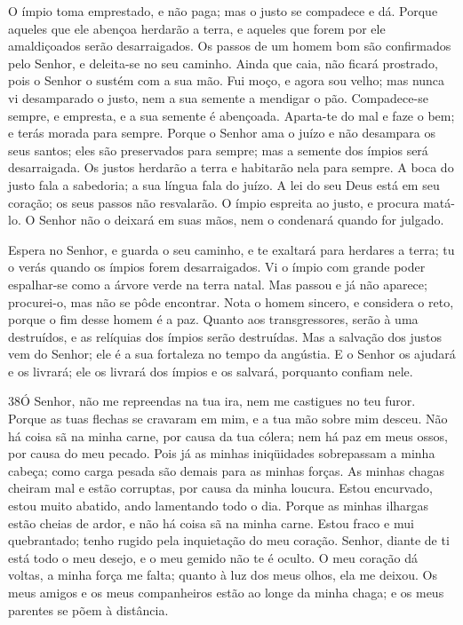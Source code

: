 O ímpio toma emprestado, e não paga; mas o justo se compadece e
dá. Porque aqueles que ele abençoa herdarão a terra, e
aqueles que forem por ele amaldiçoados serão desarraigados.
Os passos de um homem bom são confirmados pelo Senhor, e
deleita-se no seu caminho. Ainda que caia, não ficará
prostrado, pois o Senhor o sustém com a sua mão. Fui moço, e
agora sou velho; mas nunca vi desamparado o justo, nem a sua semente
a mendigar o pão. Compadece-se sempre, e empresta, e a sua
semente é abençoada. Aparta-te do mal e faze o bem; e terás
morada para sempre. Porque o Senhor ama o juízo e não
desampara os seus santos; eles são preservados para sempre; mas a
semente dos ímpios será desarraigada. Os justos herdarão a
terra e habitarão nela para sempre. A boca do justo fala a
sabedoria; a sua língua fala do juízo. A lei do seu Deus está
em seu coração; os seus passos não resvalarão. O ímpio
espreita ao justo, e procura matá-lo. O Senhor não o deixará
em suas mãos, nem o condenará quando for julgado.

Espera no Senhor, e guarda o seu caminho, e te exaltará para
herdares a terra; tu o verás quando os ímpios forem desarraigados.
Vi o ímpio com grande poder espalhar-se como a árvore verde
na terra natal. Mas passou e já não aparece; procurei-o, mas
não se pôde encontrar. Nota o homem sincero, e considera o
reto, porque o fim desse homem é a paz. Quanto aos
transgressores, serão à uma destruídos, e as relíquias dos ímpios
serão destruídas. Mas a salvação dos justos vem do Senhor;
ele é a sua fortaleza no tempo da angústia. E o Senhor os
ajudará e os livrará; ele os livrará dos ímpios e os salvará,
porquanto confiam nele.

\bigskip

\lettrine{38}{}Ó Senhor, não me repreendas na tua ira, nem me
castigues no teu furor. Porque as tuas flechas se cravaram em
mim, e a tua mão sobre mim desceu. Não há coisa sã na minha
carne, por causa da tua cólera; nem há paz em meus ossos, por causa
do meu pecado. Pois já as minhas iniqüidades sobrepassam a minha
cabeça; como carga pesada são demais para as minhas forças. As
minhas chagas cheiram mal e estão corruptas, por causa da minha
loucura.
 Estou encurvado, estou muito abatido, ando lamentando todo o dia. Porque as minhas ilhargas estão cheias de ardor, e não há coisa sã
na minha carne. Estou fraco e mui quebrantado; tenho rugido pela
inquietação do meu coração. Senhor, diante de ti está todo o meu
desejo, e o meu gemido não te é oculto. O meu coração dá
voltas, a minha força me falta; quanto à luz dos meus olhos, ela me
deixou. Os meus amigos e os meus companheiros estão ao longe
da minha chaga; e os meus parentes se põem à distância.

